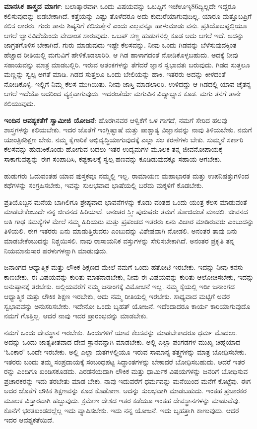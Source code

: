 \textbf{ಮಾನಸಿಕ ಶಾಸ್ತ್ರದ ಮಾರ್ಗ}: ಬಲಾತ್ಕಾರವಾಗಿ ಒಂದು ವಿಷಯವನ್ನು ಒಬಪ್ನಿಗೆ ಇಚೆಊಇ್ಕ86ದ್ಯಿಲ್ಲದೇ ಇದ್ದರೂ ಕಲಿಸುವುದನ್ನು ಬಿಡಬೇಕಾಗಿದೆ. ಕತ್ತೆಯನ್ನು ಎಷ್ಟು ತೊಳೆದರೂ ಅದು ಕುದುರೆಯಾಗುವುದಿಲ್ಲ. ಯಾರೂ ಮತ್ತೊಬಪ್ರಿಗೆ ಕಲಿಸ ಲಾರರು. ಗುರು ತಾನು ಶಿಷ್ಯನಿಗೆ ಕಲಿಸುತ್ತೇನೆ ಎಂದು ಎಲ್ಲವನ್ನೂ ಹಾಳುಮಾಡು ವನು. ಪ್ರತಿಯೊಬಪ್ನಲ್ಲಿಯೂ ಆಗಲೆ ಜ್ಞಾನವಿದೆಯೆಂದು ವೇದಾಂತ ಸಾರುವುದು. ಒಬಪ್ ಸಣ್ಣ ಹುಡುಗನಲ್ಲಿ ಕೂಡ ಅದು ಆಗಲೆ ಇದೆ. ಅದನ್ನು ಜಾಗ್ರತಗೊಳಿಸ ಬೇಕಾಗಿದೆ. ಗುರು ಮಾಡುವುದು ಇಷ್ಟೇ ಕೆಲಸವನ್ನು. ನೀವು ಒಂದು ಗಿಡವನ್ನು ಬೆಳೆಸುವುದಕ್ಕಿಂತ ಹೆಚ್ಚಾದ ರೀತಿಯಲ್ಲಿ ಮಗುವಿಗೆ ಹೇಳಿಕೊಡಲಾರಿರಿ. ಆ ಗಿಡ ಹಾಳಾಗದಂತೆ ನೋಡಿಕೊಳ್ಳಬಹುದು. ಅದಕ್ಕೆ ನೀವು ಸಹಾಯವನ್ನು ಮಾತ್ರ ಮಾಡಬಲ್ಲಿರಿ. ಇರುವ ಆತಂಕಗಳನ್ನು ತೆಗೆದರೆ ಜ್ಞಾನ ಸ್ವಭಾವತಃ ಬರುವುದು. ಗಿಡದ ಸುತ್ತಲೂ ಮಣ್ಣನ್ನು ಸ್ವಲ್ಪ ಅಗತೆ ಮಾಡಿ. ಗಿಡದ ಸುತ್ತಲೂ ಒಂದು ಬೇಲಿಯನ್ನು ಹಾಕಿ. ಇತರರು ಅದನ್ನು ಕೀಳದಂತೆ ನೋಡಿಕೊಳ್ಳಿ. ಇಲ್ಲಿಗೆ ನಿಮ್ಮ ಕೆಲಸ ಮುಗಿಯಿತು. ನೀವು ಜಾಸ್ತಿ ಮಾಡಲಾರಿರಿ. ಉಳಿದದ್ದು ಆ ಗಿಡದಲ್ಲಿ ಯಾವ ಚೈತನ್ಯ ಆಗಲೆ ಇದೆಯೊ ಅದರಿಂದ ವ್ಯಕ್ತವಾಗುವುದು. ಇದರಂತೆಯೇ ಮಗುವಿನ ವಿದ್ಯಾಭ್ಯಾಸ ಕೂಡ. ಮಗು ತನಗೆ ತಾನೇ ಕಲಿಯುವುದು.

\textbf{ಇಂದಿನ ಆವಶ್ಯಕತೆಗೆ ಸ್ವಾಮೀಜಿ ಯೋಜನೆ}: ಹೊರಗಿನವರ ಆಳ್ವಿಕೆಗೆ ಒಳ ಗಾಗದೆ, ನಮಗೆ ಸೇರಿದ ಹಲವು ಶಾಸ್ತ್ರಗಳನ್ನು ಕಲಿಯಬೇಕು. ಇದರ ಜೊತೆಗೆ ಇಂಗ್ಲಿಷ್ಭಾಷೆ ಮತ್ತು ಪಾಶ್ಚಾತ್ಯ ವಿಜ್ಞಾನವನ್ನು ನಾವು ತಿಳಿಯಬೇಕು. ನಮಗೆ ಯಾಂತ್ರಿಕಶಿಕ್ಷಣ ಬೇಕು. ನಮ್ಮ ಕೈಗಾರಿಕೆ ಅಭಿವೃದ್ಧಿಯಾಗುವುದಕ್ಕೆ ಎಲ್ಲಾ ಸಲ ಕರಣೆಗಳು ಬೇಕು. ಸುಮ್ಮನೆ ಸರ್ಕಾರಿ ಕೆಲಸವನ್ನು ಹುಡುಕಿಕೊಂಡು ಹೋಗುವ ಬದಲು ಇತರ ಉದ್ಯಮಗಳ ಮೂಲಕ ತನ್ನ ಜೀವನೋಪಾಯಕ್ಕೆ ಸಾಕಾಗುವಷ್ಟನ್ನು ಈಗ ಸಂಪಾದಿಸಿ, ಕಷ್ಟಕಾಲಕ್ಕೆ ಸ್ವಲ್ಪ ಹಣವನ್ನು ಕೂಡಿಡುವುದಕ್ಕೂ ಸಹಾಯ ಆಗಬೇಕು.

ಹುಡುಗರು ಓದುವಂತಹ ಯಾವ ಪುಸ್ತಕವೂ ನಮ್ಮಲ್ಲಿ ಇಲ್ಲ. ರಾಮಾಯಣ ಮಹಾಭಾರತ ಮತ್ತು ಉಪನಿಷತ್ತುಗಳಿಂದ ಕಥೆಗಳನ್ನು ಸಂಗ್ರಹಿಸಬೇಕು, ಇವನ್ನು ಸುಲಭವಾದ ಭಾಷೆಯಲ್ಲಿ ಬರೆದು ಮಕ್ಕಳಿಗೆ ಕೊಡಬೇಕು.

ಪ್ರತಿಯೊಬ್ಬನ ಮನೆಯ ಬಾಗಿಲಿಗೂ ಶ್ರೇಷ್ಠವಾದ ಭಾವನೆಗಳನ್ನು ಕೊಡು ವಂತಹ ಒಂದು ಯಂತ್ರ ಕೆಲಸ ಮಾಡುವಂತೆ ಮಾಡಬೇಕೆಂಬುದೇ ನನ್ನ ಜೀವನದ ಹಿರಿಯಾಸೆ. ಅನಂತರ ಸ್ತ್ರೀ ಪುರುಷರು ತಮಗೆ ತೋಚಿದಂತೆ ಮಾಡಲಿ. ಜೀವನದ ಅತಿ ಗಾಢ ಸಮಸ್ಯೆಗಳ ಮೇಲೆ ನಮ್ಮ ಹಿರಿಯರು ಮತ್ತು ಪ್ರಪಂಚದ ಇತರರು ಏನು ವಿಚಾರ ಮಾಡಿರುವರು ಎಂಬುದನ್ನು ತಿಳಿಯಲಿ. ಈಗ ಇತರರು ಏನು ಮಾಡುತ್ತಿರುವರು ಎಂಬುದನ್ನು ವಿಶೇಷವಾಗಿ ನೋಡಲಿ. ಅನಂತರ ತಾವು ಏನು ಮಾಡಬೇಕೆಂಬುದನ್ನು ನಿಶ್ಚಯಿಸಲಿ. ನಾವು ರಾಸಾಯನಿಕ ವಸ್ತುಗಳನ್ನು ಸೇರಿಸಬೇಕಾಗಿದೆ. ಅನಂತರ ಪ್ರಕೃತಿ ತನ್ನ ನಿಯಮಾನುಸಾರ ಹರಳುಗಳನ್ನಾಗಿ ಮಾಡುವುದು.

ಜನಾಂಗದ ಆಧ್ಯಾತ್ಮಿಕ ಮತ್ತು ಲೌಕಿಕ ಶಿಕ್ಷಣದ ಮೇಲೆ ನಮಗೆ ಒಂದು ಹತೋಟಿ ಇರಬೇಕು. ಇದನ್ನು ನೀವು ಕನಸು ಕಾಣಬೇಕು, ಈ ವಿಷಯವನ್ನು ಕುರಿತು ಮಾತನಾಡಬೇಕು, ನೀವು ಈ ವಿಷಯವನ್ನು ಕುರಿತು ಆಲೋಚಿಸಬೇಕು, ಇದನ್ನು ಅನುಷ್ಠಾನಕ್ಕೆ ತರಬೇಕು. ಅಲ್ಲಿಯವರೆಗೆ ನಮ್ಮ ಜನಾಂಗಕ್ಕೆ ವಿಮೋಚನೆ ಇಲ್ಲ. ನಮ್ಮ ಕೈಯಲ್ಲಿ ಇಡೀ ಜನಾಂಗದ ಆಧ್ಯಾತ್ಮಿಕ ಮತ್ತು ಲೌಕಿಕ ಶಿಕ್ಷಣ ಇರಬೇಕು, ಅದು ನಮ್ಮ ರೀತಿಯಲ್ಲಿ ಇರಬೇಕು. ಸಾಧ್ಯವಾದ ಮಟ್ಟಿಗೆ ಅವರ ಸ್ವಭಾವವನ್ನು ಅನುಸರಿಸಬೇಕು. ಇದೇನೋ ಒಂದು ಬೃಹತ್ ಯೋಜನೆ. ಇದೆಂದಾದರೂ ಕಾರ್ಯ ಕಾರಿಯಾಗುವುದೊ ನಮಗೆ ಗೊತ್ತಿಲ್ಲ. ಆದರೆ ನಾವು ಇದರ ಪ್ರಾರಂಭವನ್ನು ಮಾಡಬೇಕು.

ನಮಗೆ ಒಂದು ದೇವಸ್ಥಾನ ಇರಬೇಕು. ಹಿಂದುಗಳಿಗೆ ಯಾವ ಕೆಲಸವನ್ನು ಮಾಡಬೇಕಾದರೂ ಧರ್ಮ ಮೊದಲು. ಅದನ್ನು ಒಂದು ಜಾತ್ಯತೀತವಾದ ದೇವ ಸ್ಥಾನವನ್ನಾಗಿ ಮಾಡಬೇಕು. ಅಲ್ಲಿ ಎಲ್ಲಾ ಪಂಗಡಗಳ ಮುಖ್ಯ ಚಿಹ್ನೆಯಾದ ‘ಓಂಕಾರ’ ಒಂದೇ ಇರಬೇಕು. ಅಲ್ಲಿ ಎಲ್ಲಾ ಮತಗಳಲ್ಲಿಯೂ ಇರುವ ಸಾಮಾನ್ಯ ತತ್ತ್ವಗಳನ್ನು ಮಾತ್ರ ಬೋಧಿಸಬೇಕು. ಇತರರು ಬಂದು ತಮ್ಮ ಸಂಪ್ರದಾಯಕ್ಕೆ ಸಂಬಂಧಪಟ್ಟ ಸಿದ್ಧಾಂತಗಳನ್ನು ಬೇಕಾದರೆ ಬೋಧಿಸಬಹುದು. ಆದರೆ ಇತರ ರನ್ನು ಎಂದಿಗೂ ಖಂಡಿಸಕೂಡದು. ಎರಡನೆಯದಾಗಿ ಲೌಕಿಕ ಮತ್ತು ಧಾರ್ಮಿಕ ವಿಷಯಗಳನ್ನು ಜನರಿಗೆ ಬೋಧಿಸುವ ಪ್ರಚಾರಕರನ್ನು ಇದು ತರಬೇತು ಮಾಡ ಬೇಕು. ನಾವು ಇದುವರೆಗೆ ಧರ್ಮವನ್ನು ಮನೆಯಿಂದ ಮನೆಗೆ ಕೊಟ್ಟೆವು. ಈಗ ಅದರ ಜೊತೆಗೆ ಲೌಕಿಕ ಶಿಕ್ಷಣವನ್ನು ಕೂಡ ಕೊಡೋಣ. ಅದನ್ನು ಸುಲಭವಾಗಿ ಮಾಡಬಹುದು. ಇಂತಹ ಪ್ರಚಾರಕರ ಮೂಲಕ ವಿಸ್ತಾರವಾಗಿ ಹಬ್ಬುವುದು. ಕ್ರಮೇಣ ದೇಶದ ಇತರ ಕಡೆಯೂ ಇಂತಹ ದೇವಸ್ಥಾನಗಳನ್ನು ಮಾಡುವೆವು. ಕೊನೆಗೆ ಭರತಖಂಡದಲ್ಲೆಲ್ಲ ಇದು ವ್ಯಾಪಿಸಬೇಕು. ಇದು ನನ್ನ ಯೋಜನೆ. ಇದು ಬೃಹತ್ತಾಗಿ ಕಾಣುವುದು. ಆದರೆ ಇದರ ಆವಶ್ಯಕತೆಯಿದೆ.

